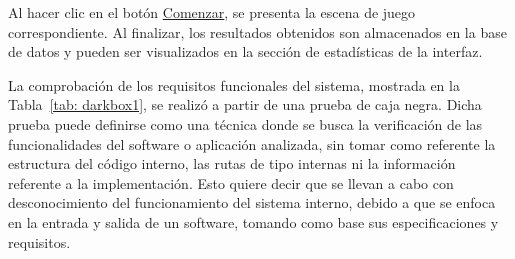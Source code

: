 Al hacer clic en el botón \underline{Comenzar}, se presenta la escena de juego correspondiente. Al finalizar, los resultados obtenidos son almacenados en la base de datos y pueden ser visualizados en la sección de estadísticas de la interfaz. 

La comprobación de los requisitos funcionales del sistema, mostrada en la Tabla~\ref{tab: darkbox1}, se realizó a partir de una prueba de caja negra. Dicha prueba puede definirse como una técnica donde se busca la verificación de las funcionalidades del software o aplicación analizada, sin tomar como referente la estructura del código interno, las rutas de tipo internas ni la información referente a la implementación. Esto quiere decir que se llevan a cabo con desconocimiento del funcionamiento del sistema interno, debido a que se enfoca en la entrada y salida de un software, tomando como base sus especificaciones y requisitos.    

